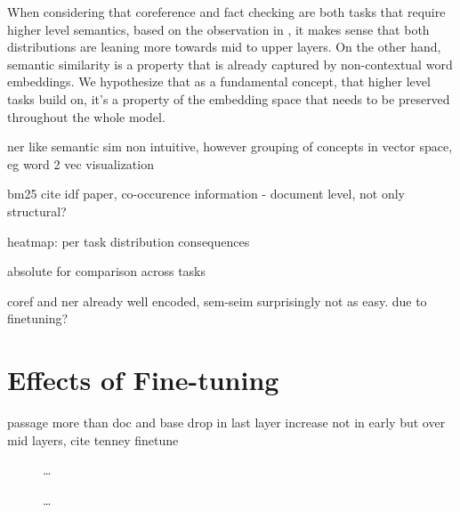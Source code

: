 When considering that coreference and fact checking are both tasks that require higher level semantics, based on the observation in \cite{tenney-etal-2019-bert}, it makes sense that both distributions are leaning more towards mid to upper layers. On the other hand, semantic similarity is a property that is already captured by non-contextual word embeddings. We hypothesize that as a fundamental concept, that higher level tasks build on, it's a property of the embedding space that needs to be preserved throughout the whole model. 


ner like semantic sim non intuitive, however grouping of concepts in vector space, eg word 2 vec visualization

bm25 cite idf paper, co-occurence information - document level, not only structural?



heatmap: per task distribution consequences

absolute for comparison across tasks

coref and ner already well encoded, sem-seim surprisingly not as easy. due to finetuning?

\section{Effects of Fine-tuning}
passage more than doc and base
drop in last layer
increase not in early but over mid layers, cite tenney finetune


\begin{figure}%
    \centering
    \caption{\dots}
\end{figure}

\begin{figure}
    \label{fig:sem_sim}
    \centering
    \caption{\dots }
\end{figure}

